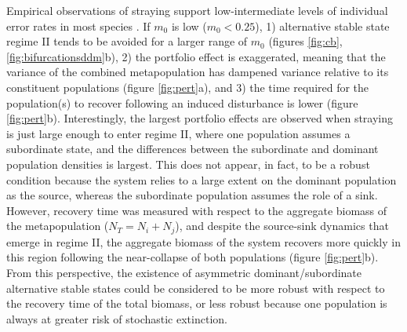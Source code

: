 \documentclass{revtex4}
\begin{document}
Empirical observations of straying support low-intermediate levels of individual error rates in most species \citep{H:2013fs,Keefer:2014gg}.
If $m_0$ is low ($m_0<0.25$),
1) alternative stable state regime II tends to be avoided for a larger range of $m_0$ (figures \ref{fig:cb}, \ref{fig:bifurcationsddm}b),
2) the portfolio effect is exaggerated, meaning that the variance of the combined metapopulation has dampened variance relative to its constituent populations (figure \ref{fig:pert}a), and
3) the time required for the population(s) to recover following an induced disturbance is lower (figure \ref{fig:pert}b).
Interestingly, the largest portfolio effects are observed when straying is just large enough to enter regime II, where one population assumes a subordinate state, and the differences between the subordinate and dominant population densities is largest.
This does not appear, in fact, to be a robust condition because the system relies to a large extent on the dominant population as the source, whereas the subordinate population assumes the role of a sink.
However, recovery time was measured with respect to the aggregate biomass of the metapopulation ($N_T = N_i + N_j$), and despite the source-sink dynamics that emerge in regime II, the aggregate biomass of the system recovers more quickly in this region following the near-collapse of both populations (figure \ref{fig:pert}b).
From this perspective, the existence of asymmetric dominant/subordinate alternative stable states could be considered to be more robust with respect to the recovery time of the total biomass, or less robust because one population is always at greater risk of stochastic extinction.
\end{document}
